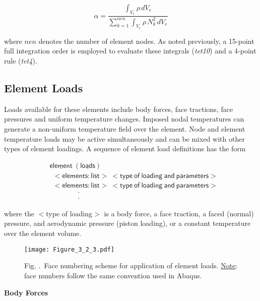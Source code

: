 \documentclass[11pt]{report}
\numberwithin{equation}{section}
\newcommand{\nf} {\normalsize}
\newcommand{\bmf } {\boldsymbol }  %
\newcommand{\ul} {\underline}
\newcommand{\hv} {\mathsf}   %
\newcommand{\ti}{\emph}
\newcommand{\noi}{\noindent}
\newcommand{\tfour}{\ti{tet4}\xspace}
\newcommand{\tten}{\ti{tet10}\xspace}
\renewcommand{\thefigure}{\thesection.\arabic{figure}}
\begin{document}
\begin{equation} \label{eq:mass-alpha}
 \alpha = \frac{ \int_{V_e} \rho \, d V_e }{  \sum_{k=1}^{nen} \int_{V_e} \rho \,N_k^2\, d V_e }
 \end{equation}
 
\noi where $nen$ denotes the number of element nodes. As noted previously, a 15-point
full integration order is employed to evaluate these integrals (\tten) and a 4-point rule (\tfour).

 
\subsection {Element Loads}

Loads available for these elements include body forces, face tractions, face
pressures and uniform temperature changes. Imposed nodal temperatures can
generate a non-uniform temperature field over the element. Node and element
temperature loads may be active simultaneously and can be mixed with other types
of element loadings. A sequence of element load definitions has the form

\small
\begin{align*}
&\hv{\ul{element}\ (\ul{loads})} \\
&\hv{\ \ <elements: list>\ <type\ of\ loading\ and\ parameters>}\\
&\hv{\ \ <elements: list>\ <type\ of\ loading\ and\ parameters>}\\
&\qquad\qquad{\bmf{\cdot}}\\
&\qquad\qquad{\bmf{\cdot}}
\end{align*} 

\nf
%

\noi where the $<$type of loading$>$ is a body force, a face traction, a faced (normal)
pressure, and aerodynamic pressure (piston loading), or a constant temperature
over the element volume.



%
\begin{figure}
\begin{center}
\texttt{[image: Figure\_3\_2\_3.pdf]} 
\caption{{\small Fig. \thefigure\ Face numbering scheme for application of element 
loads. \ul{Note}: face numbers follow the same convention used in Abaqus.}
\label{fig:tet3}}
%
\end{center}
\end{figure}
%
\nf
\noi \textbf{Body Forces}
\end{document}
